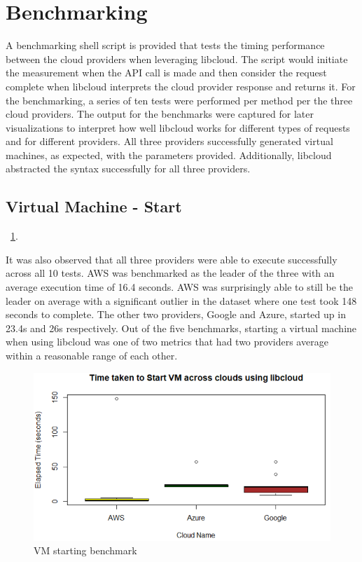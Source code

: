 \section{Benchmarking}

A benchmarking shell script is provided that tests the timing performance
between the cloud providers when leveraging libcloud. The script would initiate
the measurement when the API call is made and then consider the request
complete when libcloud interprets the cloud provider response and returns it.
For the benchmarking, a series of ten tests were performed per method per the
three cloud providers. The output for the benchmarks were captured for later
visualizations to interpret how well libcloud works for different types of
requests and for different providers. All three providers successfully
generated virtual machines, as expected, with the parameters provided.
Additionally, libcloud abstracted the syntax successfully for all three
providers. 

\subsection{Virtual Machine - Start}~\ref{F:vm-start}.

It was also observed that all three providers were able to execute successfully
across all 10 tests. AWS was benchmarked as the leader of the three with an
average execution time of 16.4 seconds. AWS was surprisingly able to still be
the leader on average with a significant outlier in the dataset where one test
took 148 seconds to complete. The other two providers, Google and
Azure, started up in 23.4s and 26s respectively. Out of the five benchmarks,
starting a virtual machine when using libcloud was one of two metrics that had
two providers average within a reasonable range of each other. 

\begin{figure}[!ht]
  \centering
  \includegraphics[width=\columnwidth]{images/StartVM.png}
  \caption{VM starting benchmark}\label{F:vm-start}
\end{figure}

